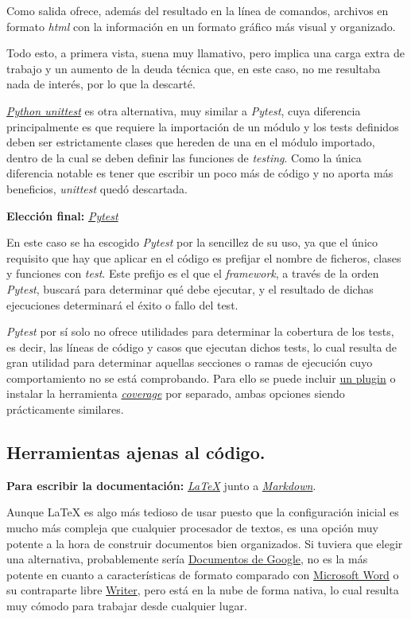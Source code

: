 Como salida ofrece, además del resultado en la línea de comandos, archivos en formato \textit{html} con la información en un formato gráfico más visual y organizado.

Todo esto, a primera vista, suena muy llamativo, pero implica una carga extra de trabajo y un aumento de la deuda técnica que, en este caso, no me resultaba nada de interés, por lo que la descarté.

\href{https://docs.python.org/3/library/unittest.html}{\textit{Python unittest}} es otra alternativa, muy similar a \textit{Pytest}, cuya diferencia principalmente es que requiere la importación de un módulo y los tests definidos deben ser estrictamente clases que hereden de una en el módulo importado, dentro de la cual se deben definir las funciones de \textit{testing}. Como la única diferencia notable es tener que escribir un poco más de código y no aporta más beneficios, \textit{unittest} quedó descartada.

\textbf{Elección final:} \href{https://docs.Pytest.org/}{\textit{Pytest}}

En este caso se ha escogido \textit{Pytest} por la sencillez de su uso, ya que el único requisito que hay que aplicar en el código es prefijar el nombre de ficheros, clases y funciones con \textit{test}. Este prefijo es el que el \textit{framework}, a través de la orden \textit{Pytest}, buscará para determinar qué debe ejecutar, y el resultado de dichas ejecuciones determinará el éxito o fallo del test.

\textit{Pytest} por sí solo no ofrece utilidades para determinar la cobertura de los tests, es decir, las líneas de código y casos que ejecutan dichos tests, lo cual resulta de gran utilidad para determinar aquellas secciones o ramas de ejecución cuyo comportamiento no se está comprobando. Para ello se puede incluir \href{https://pypi.org/project/pytest-cov/}{un plugin} o instalar la herramienta \href{https://coverage.readthedocs.io/}{\textit{coverage}} por separado, ambas opciones siendo prácticamente similares.


\subsection{Herramientas ajenas al código.}

\textbf{Para escribir la documentación:} \href{https://www.latex-project.org/}{\textit{LaTeX}} junto a \href{https://www.markdownguide.org/getting-started/}{\textit{Markdown}}.

Aunque LaTeX es algo más tedioso de usar puesto que la configuración inicial es mucho más compleja que cualquier procesador de textos, es una opción muy potente a la hora de construir documentos bien organizados. Si tuviera que elegir una alternativa, probablemente sería \href{https://workspace.google.com/intl/es/products/docs/}{Documentos de Google}, no es la más potente en cuanto a características de formato comparado con \href{https://www.microsoft.com/es-es/microsoft-365/word}{Microsoft Word} o su contraparte libre \href{https://es.libreoffice.org/descubre/writer/}{Writer}, pero está en la nube de forma nativa, lo cual resulta muy cómodo para trabajar desde cualquier lugar.

